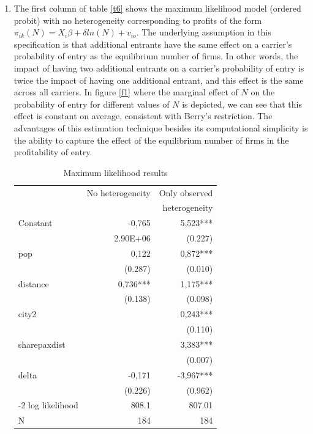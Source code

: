 \documentclass[12pt,english]{article}
\begin{document}
\begin{enumerate}
\item The first column of table \eqref{t6} shows the maximum likelihood model  (ordered probit) with no heterogeneity corresponding to profits of the form $\pi_{ik}(N)=X_{i}\beta+\delta ln(N)+v_{io}$. The underlying assumption in this specification is that additional entrants have the same effect on a carrier's probability of entry as the equilibrium number of firms. In other words, the impact of having two additional entrants on a carrier's probability of entry is twice the impact of having one additional entrant, and this effect is the same across all carriers. In figure \eqref{f1} where the marginal effect of $N$ on the probability of entry for different values of $N$ is depicted, we can see that this effect is constant on average, consistent with Berry's restriction. The advantages of this estimation technique besides its computational simplicity is the ability to capture the effect of the equilibrium number of firms in the profitability of entry.


\begin{table}[H]
  \centering
  \caption{Maximum likelihood results}
    \begin{tabular}{lrr}
    \hline
          & No heterogeneity & Only observed  \\
          &&heterogeneity\\
    \hline
     Constant & -0,765 & 5,523*** \\
          & 2.90E+06 & (0.227) \\
    pop   & 0,122 & 0,872*** \\
          & (0.287) & (0.010) \\
    distance & 0,736*** & 1,175*** \\
          & (0.138) & (0.098) \\
    city2 &       & 0,243*** \\
          &       & (0.110) \\
    sharepaxdist &       & 3,383*** \\
          &       & (0.007) \\
    delta & -0,171 & -3,967*** \\
          & (0.226) & (0.962) \\
          \hline
    -2 log likelihood & 808.1 & 807.01 \\
   N     & 184   & 184 \\
    \hline
    \end{tabular}%
  \label{t6}%
\end{table}


\end{enumerate}
\end{document}
